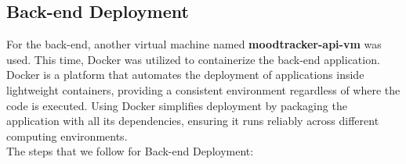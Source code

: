 \subsection{Back-end Deployment}

For the back-end, another virtual machine named \textbf{moodtracker-api-vm} was used. This time, Docker was utilized to containerize the back-end application. Docker is a platform that automates the deployment of applications inside lightweight containers, providing a consistent environment regardless of where the code is executed. Using Docker simplifies deployment by packaging the application with all its dependencies, ensuring it runs reliably across different computing environments.\vspace{5mm} \\
The steps that we follow for Back-end Deployment:

